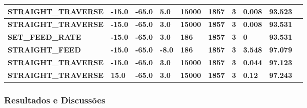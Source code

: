 \documentclass[aspectratio=169]{beamer}
\begin{document}
{\begin{frame}[fragile]
\begin{tabular}{|l|l|l|l|l|l|l|l|l|l|}
    \tiny{\bfseries{STRAIGHT\_TRAVERSE}} & 
    \tiny{\bfseries{-15.0}} & 
    \tiny{\bfseries{-65.0}} & 
    \tiny{\bfseries{5.0}} & 
    \tiny{\bfseries{15000}} & 
    \tiny{\bfseries{1857}} & 
    \tiny{\bfseries{3}} & 
    \tiny{\bfseries{0.008}} & 
    \tiny{\bfseries{93.523}} \\
    \hline

    \tiny{\bfseries{STRAIGHT\_TRAVERSE}} & 
    \tiny{\bfseries{-15.0}} & 
    \tiny{\bfseries{-65.0}} & 
    \tiny{\bfseries{3.0}} & 
    \tiny{\bfseries{15000}} & 
    \tiny{\bfseries{1857}} & 
    \tiny{\bfseries{3}} & 
    \tiny{\bfseries{0.008}} & 
    \tiny{\bfseries{93.531}} \\
    \hline

    \tiny{\bfseries{SET\_FEED\_RATE}} & 
    \tiny{\bfseries{-15.0}} & 
    \tiny{\bfseries{-65.0}} & 
    \tiny{\bfseries{3.0}} & 
    \tiny{\bfseries{186}} & 
    \tiny{\bfseries{1857}} & 
    \tiny{\bfseries{3}} & 
    \tiny{\bfseries{0}} & 
    \tiny{\bfseries{93.531}} \\
    \hline

    \tiny{\bfseries{STRAIGHT\_FEED}} & 
    \tiny{\bfseries{-15.0}} & 
    \tiny{\bfseries{-65.0}} & 
    \tiny{\bfseries{-8.0}} & 
    \tiny{\bfseries{186}} & 
    \tiny{\bfseries{1857}} & 
    \tiny{\bfseries{3}} & 
    \tiny{\bfseries{3.548}} & 
    \tiny{\bfseries{97.079}} \\
    \hline    

    \tiny{\bfseries{STRAIGHT\_TRAVERSE}} & 
    \tiny{\bfseries{-15.0}} & 
    \tiny{\bfseries{-65.0}} & 
    \tiny{\bfseries{3.0}} & 
    \tiny{\bfseries{15000}} & 
    \tiny{\bfseries{1857}} & 
    \tiny{\bfseries{3}} & 
    \tiny{\bfseries{0.044}} & 
    \tiny{\bfseries{97.123}} \\
    \hline    

    \tiny{\bfseries{STRAIGHT\_TRAVERSE}} & 
    \tiny{\bfseries{15.0}} & 
    \tiny{\bfseries{-65.0}} & 
    \tiny{\bfseries{3.0}} & 
    \tiny{\bfseries{15000}} & 
    \tiny{\bfseries{1857}} & 
    \tiny{\bfseries{3}} & 
    \tiny{\bfseries{0.12}} & 
    \tiny{\bfseries{97.243}} \\
    \hline

  \end{tabular}

\end{frame}  


\begin{frame}[fragile]
  \frametitle{Resultados e Discussões}  

    \begin{tabular}{|l|l|l|l|l|l|l|l|l|l|}


\end{tabular}
\end{frame}}
\end{document}
